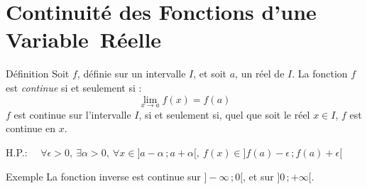 \documentclass{coursbook}
\begin{document}
    \chapter{Continuité des Fonctions d'une Variable~Réelle}
    \begin{Gpartie}{Définition}
        Soit $f$, définie sur un intervalle $I$, et soit $a$, un réel de $I$.
        La fonction $f$ est \emph{continue} si et seulement si : \[\boxed{\lim_{x \to a} f(x)=f(a)}\]
        $f$ est continue sur l'intervalle $I$, si et seulement si, quel que soit le réel $x\in I$, $f$ est continue en $x$.

        H.P.: $\quad\forall\epsilon >0,~\exists\alpha >0,~\forall x\in\big]a-\alpha\,;a+\alpha\big[,~f(x)\in\big]f(a)-\epsilon\,;f(a)+\epsilon\big[$
        \begin{Spartie}{Exemple}
            La fonction inverse est continue sur $\big]-\infty\,;0\big[$, et sur $\big]0\,;+\infty\big[$.


\end{Spartie}
\end{Gpartie}
\end{document}
